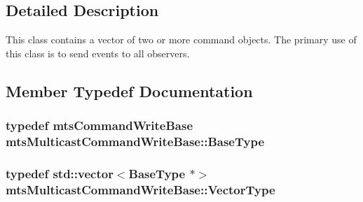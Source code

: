 \subsection{Detailed Description}
This class contains a vector of two or more command objects. The primary use of this class is to send events to all observers. 

\subsection{Member Typedef Documentation}
\hypertarget{classmts_multicast_command_write_base_a062bc9363d14a3f801a45fee24772a97}{
\subsubsection[{Base\-Type}]{\setlength{\rightskip}{0pt plus 5cm}typedef {\bf mts\-Command\-Write\-Base} {\bf mts\-Multicast\-Command\-Write\-Base\-::\-Base\-Type}}}\label{classmts_multicast_command_write_base_a062bc9363d14a3f801a45fee24772a97}
\hypertarget{classmts_multicast_command_write_base_a25953a3da11d172a87774cfebe55eaa9}{
\subsubsection[{Vector\-Type}]{\setlength{\rightskip}{0pt plus 5cm}typedef std\-::vector$<${\bf Base\-Type} $\ast$$>$ {\bf mts\-Multicast\-Command\-Write\-Base\-::\-Vector\-Type}}}\label{classmts_multicast_command_write_base_a25953a3da11d172a87774cfebe55eaa9}


